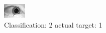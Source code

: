 \begin{figure}[h!]
\begin{center}
\includegraphics[width=0.60\columnwidth]{figures/ID1520_class_2_target_1.png}
\end{center}
\caption{ Classification: 2 actual target: 1}
\label{fig:ID1520_class_2_target_1}
\end{figure}
